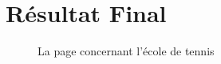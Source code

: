 \documentclass{article}[12pt]
\begin{document}
    \section{Résultat Final}
    \begin{figure}[H]
     	\centering
     	\caption{La page concernant l'école de tennis}
     \end{figure}
\end{document}
